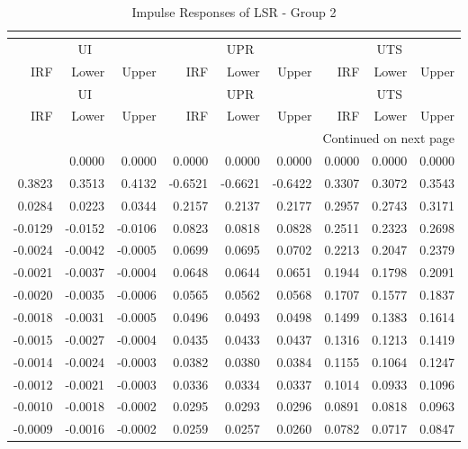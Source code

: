 \begin{longtable}{rrrrrrrrr}
\caption{Impulse Responses of LSR - Group 2}\\
\label{tab:lsr_irf_group2}\\
\toprule
\multicolumn{3}{c}{UI} & \multicolumn{3}{c}{UPR} & \multicolumn{3}{c}{UTS} \\
IRF & Lower & Upper & IRF & Lower & Upper & IRF & Lower & Upper \\
\midrule
\endfirsthead
\toprule
\multicolumn{3}{c}{UI} & \multicolumn{3}{c}{UPR} & \multicolumn{3}{c}{UTS} \\
IRF & Lower & Upper & IRF & Lower & Upper & IRF & Lower & Upper \\
\midrule
\endhead
\midrule
\multicolumn{9}{r}{Continued on next page} \\
\midrule
\endfoot
\bottomrule
\endlastfoot
0.0000 & 0.0000 & 0.0000 & 0.0000 & 0.0000 & 0.0000 & 0.0000 & 0.0000 & 0.0000 \\
0.3823 & 0.3513 & 0.4132 & -0.6521 & -0.6621 & -0.6422 & 0.3307 & 0.3072 & 0.3543 \\
0.0284 & 0.0223 & 0.0344 & 0.2157 & 0.2137 & 0.2177 & 0.2957 & 0.2743 & 0.3171 \\
-0.0129 & -0.0152 & -0.0106 & 0.0823 & 0.0818 & 0.0828 & 0.2511 & 0.2323 & 0.2698 \\
-0.0024 & -0.0042 & -0.0005 & 0.0699 & 0.0695 & 0.0702 & 0.2213 & 0.2047 & 0.2379 \\
-0.0021 & -0.0037 & -0.0004 & 0.0648 & 0.0644 & 0.0651 & 0.1944 & 0.1798 & 0.2091 \\
-0.0020 & -0.0035 & -0.0006 & 0.0565 & 0.0562 & 0.0568 & 0.1707 & 0.1577 & 0.1837 \\
-0.0018 & -0.0031 & -0.0005 & 0.0496 & 0.0493 & 0.0498 & 0.1499 & 0.1383 & 0.1614 \\
-0.0015 & -0.0027 & -0.0004 & 0.0435 & 0.0433 & 0.0437 & 0.1316 & 0.1213 & 0.1419 \\
-0.0014 & -0.0024 & -0.0003 & 0.0382 & 0.0380 & 0.0384 & 0.1155 & 0.1064 & 0.1247 \\
-0.0012 & -0.0021 & -0.0003 & 0.0336 & 0.0334 & 0.0337 & 0.1014 & 0.0933 & 0.1096 \\
-0.0010 & -0.0018 & -0.0002 & 0.0295 & 0.0293 & 0.0296 & 0.0891 & 0.0818 & 0.0963 \\
-0.0009 & -0.0016 & -0.0002 & 0.0259 & 0.0257 & 0.0260 & 0.0782 & 0.0717 & 0.0847 \\
\end{longtable}